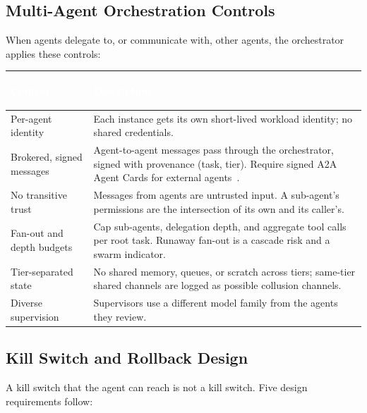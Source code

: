 \documentclass[11pt,letterpaper]{article}
\newcommand{\hrow}{\rowcolor{slategraphite}}
\newcommand{\hdr}[1]{\textcolor{white}{\bfseries\strut #1}}
\begin{document}
\subsection{Multi-Agent Orchestration Controls}
\label{sec:multiagent}

When agents delegate to, or communicate with, other agents, the orchestrator applies these controls:

\begin{longtable}{L{3.8cm} L{12.2cm}}
\hrow \hdr{Control} & \hdr{Description} \\
\endhead
Per-agent identity & Each instance gets its own short-lived workload identity; no shared credentials. \\
Brokered, signed messages & Agent-to-agent messages pass through the orchestrator, signed with provenance (task, tier). Require signed A2A Agent Cards for external agents~\cite{a2a}. \\
No transitive trust & Messages from agents are untrusted input. A sub-agent's permissions are the intersection of its own and its caller's. \\
Fan-out and depth budgets & Cap sub-agents, delegation depth, and aggregate tool calls per root task. Runaway fan-out is a cascade risk and a swarm indicator. \\
Tier-separated state & No shared memory, queues, or scratch across tiers; same-tier shared channels are logged as possible collusion channels. \\
Diverse supervision & Supervisors use a different model family from the agents they review. \\*
\bottomrule
\end{longtable}

\subsection{Kill Switch and Rollback Design}
\label{sec:killswitch}

A kill switch that the agent can reach is not a kill switch. Five design requirements follow:
\end{document}
